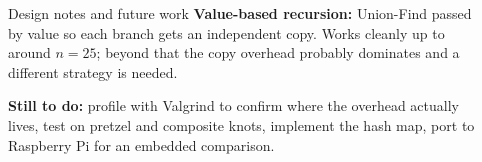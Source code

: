 \documentclass[final]{beamer}
\newlength{\sepwidth}
\newlength{\colwidth}
\newcommand{\separatorcolumn}{\begin{column}{\sepwidth}\end{column}}
\begin{document}
\begin{frame}[t,fragile]
\begin{columns}[t]
\begin{column}{\colwidth}
\begin{block}{Design notes and future work}
    \vspace{0.1cm}
    \textbf{Value-based recursion:} Union-Find passed by value so each branch gets an independent copy. Works cleanly up to around $n = 25$; beyond that the copy overhead probably dominates and a different strategy is needed.

    \vspace{0.1cm}
    \textbf{Still to do:} profile with Valgrind to confirm where the overhead actually lives, test on pretzel and composite knots, implement the hash map, port to Raspberry Pi for an embedded comparison.
  \end{block}

\end{column}

\separatorcolumn
\end{columns}
\end{frame}
\end{document}
